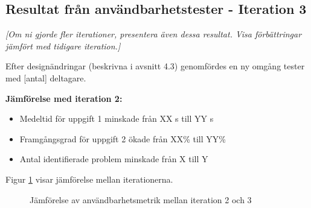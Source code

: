 \subsection{Resultat från användbarhetstester - Iteration 3}

\textit{[Om ni gjorde fler iterationer, presentera även dessa resultat. Visa förbättringar jämfört med tidigare iteration.]}

Efter designändringar (beskrivna i avsnitt 4.3) genomfördes en ny omgång tester med [antal] deltagare.

\textbf{Jämförelse med iteration 2:}

\begin{itemize}
    \item Medeltid för uppgift 1 minskade från XX s till YY s
    \item Framgångsgrad för uppgift 2 ökade från XX\% till YY\%
    \item Antal identifierade problem minskade från X till Y
\end{itemize}

Figur \ref{fig:comparison} visar jämförelse mellan iterationerna.

\begin{figure}[h]
    \centering
    \caption{Jämförelse av användbarhetsmetrik mellan iteration 2 och 3}
    \label{fig:comparison}
\end{figure}
